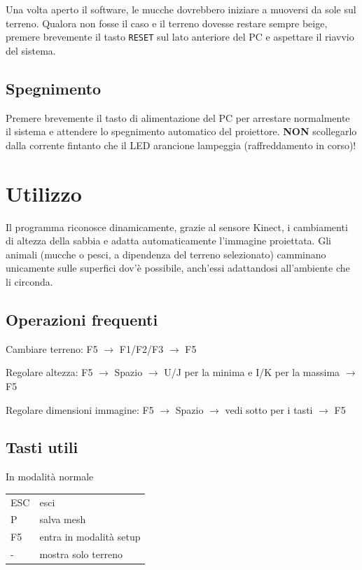 \documentclass[12pt]{article}
\begin{document}
Una volta aperto il software, le mucche dovrebbero iniziare a muoversi da sole sul terreno. Qualora non fosse il caso e
il terreno dovesse restare sempre beige, premere brevemente il tasto \texttt{RESET} sul lato anteriore del PC
e aspettare il riavvio del sistema.\\


\subsection{Spegnimento}

Premere brevemente il tasto di alimentazione del PC per arrestare normalmente il sistema e
attendere lo spegnimento automatico del proiettore. \textbf{NON} scollegarlo
dalla corrente fintanto che	il LED arancione lampeggia (raffreddamento in corso)!


\section{Utilizzo}

Il programma riconosce dinamicamente, grazie al sensore Kinect, i cambiamenti di altezza della sabbia
e adatta automaticamente l'immagine proiettata. Gli animali (mucche o pesci, a dipendenza del terreno
selezionato) camminano unicamente sulle superfici dov'è possibile, anch'essi adattandosi all'ambiente
che li circonda.

\subsection{Operazioni frequenti}

Cambiare terreno: F5 $\rightarrow$ F1/F2/F3 $\rightarrow$ F5

Regolare altezza: F5 $\rightarrow$ Spazio $\rightarrow$ U/J per la minima e I/K per la massima $\rightarrow$ F5

Regolare dimensioni immagine: F5 $\rightarrow$ Spazio $\rightarrow$ vedi sotto per i tasti $\rightarrow$ F5

\newpage
\subsection{Tasti utili}\label{sec:commands}

In modalità normale

\begin{tabular}{l l}
	ESC & esci                    \\
	P   & salva mesh              \\
	F5  & entra in modalità setup \\
	-   & mostra solo terreno     \\
\end{tabular}
\end{document}
